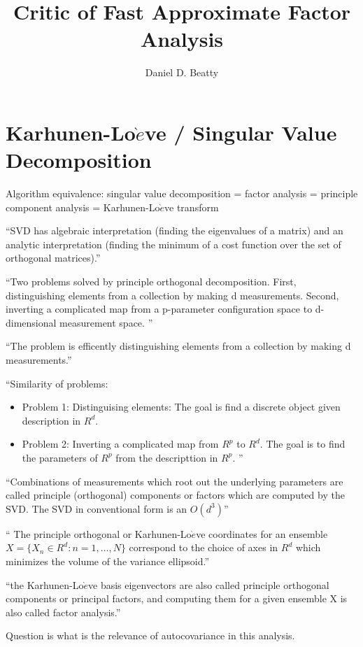 \documentclass[11pt]{book}
\title{Critic of Fast Approximate Factor Analysis}
\author{Daniel D. Beatty}
\begin{document}
\maketitle
\tableofcontents
\newpage


\chapter{Karhunen-Lo$\grave{e}$ve / Singular Value Decomposition}
Algorithm equivalence: singular value decomposition = factor analysis = principle component analysis = Karhunen-Lo$\grave{e}$ve transform

``SVD has  algebraic  interpretation (finding the eigenvalues of a matrix) and an analytic interpretation (finding the minimum of a cost function over the set of orthogonal matrices).''

 ``Two problems solved by  principle orthogonal decomposition.  First, distinguishing elements from a collection by making d measurements.  Second, inverting a complicated map from a p-parameter configuration space to d-dimensional measurement space. '' 

``The problem is efficently distinguishing elements from a collection by making d measurements.''

 ``Similarity of problems:\begin{itemize}
\item Problem 1: Distinguising elements:  The goal is find a discrete object given description in $R^d$.  
\item Problem 2: Inverting a complicated map from $R^p$ to $R^d$.  The goal is to find the parameters of $R^p$ from the descripttion in $R^p$. ''
\end{itemize}

 ``Combinations of measurements which root out the underlying parameters are called principle (orthogonal) components or factors which are computed by the SVD.  The SVD in conventional form is an $O(d^3)$''

`` The principle orthogonal or Karhunen-Lo$\grave{e}$ve coordinates for an ensemble $X=\{X_n \in R^d : n=1, \ldots , N\}$ correspond to the choice of axes in $R^d$ which minimizes the volume of the variance ellipsoid.''


``the Karhunen-Lo$\grave{e}$ve basis eigenvectors are also called principle orthogonal components or principal factors, and computing them for a given ensemble X is also called factor analysis.''

Question is what is the relevance of autocovariance in this analysis.  
\end{document}

